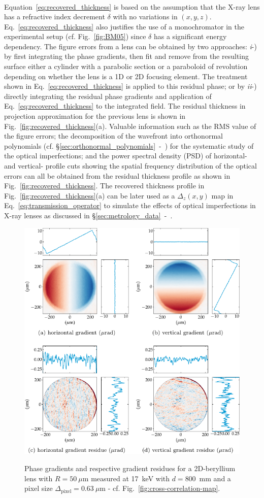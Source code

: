 \begin{refsection}
\begin{align}
\end{align}{}
Equation~\ref{eq:recovered_thickness} is based on the assumption that the X-ray lens has a refractive index decrement $\delta$ with no variations in $(x,y,z)$. Eq.~\ref{eq:recovered_thickness} also justifies the use of a monochromator in the experimental setup (cf. Fig.~\ref{fig:BM05}) since $\delta$ has a significant energy dependency. The figure errors from a lens can be obtained by two approaches: \textit{i}-) by first integrating the phase gradients, then fit and remove from the resulting surface either a cylinder with a parabolic section or a paraboloid of revolution depending on whether the lens is a 1D or 2D focusing element. The treatment shown in Eq.~\ref{eq:recovered_thickness} is applied to this residual phase; or by \textit{ii}-) directly integrating the residual phase gradients and application of Eq.~\ref{eq:recovered_thickness} to the integrated field. The residual thickness in projection approximation for the previous lens is shown in Fig.~\ref{fig:recovered_thickness}(a). Valuable information such as the RMS value of the figure errors; the decomposition of the wavefront into orthonormal polynomials (cf. \S\ref{sec:orthonormal_polynomials}~-~\textit{}) for the systematic study of the optical imperfections; and the power spectral density (PSD) of horizontal- and vertical- profile cuts showing the spatial frequency distribution of the optical errors can all be obtained from the residual thickness profile as shown in Fig.~\ref{fig:recovered_thickness}. The recovered thickness profile in Fig.~\ref{fig:recovered_thickness}(a) can be later used as a $\Delta_z(x,y)$ map in Eq.~\ref{eq:transmission_operator} to simulate the effects of optical imperfections in X-ray lenses as discussed in \S\ref{sec:metrology_data}~-~\textit{}. 

\begin{figure}[t]
        \centering
        {\includegraphics[width=.60\linewidth]{figures/ch04b/gradients.pdf}}
        \caption[Recovered phase gradient and residues]{Phase gradients and respective gradient residues for a 2D-beryllium lens with $R=50~\mu$m measured at 17~keV with $d=800$~mm and a pixel size $\Delta_\text{pixel}= 0.63~\mu$m - cf. Fig.~\ref{fig:cross-correlation-map}.}\label{fig:gradients}
\end{figure}


\end{refsection}
